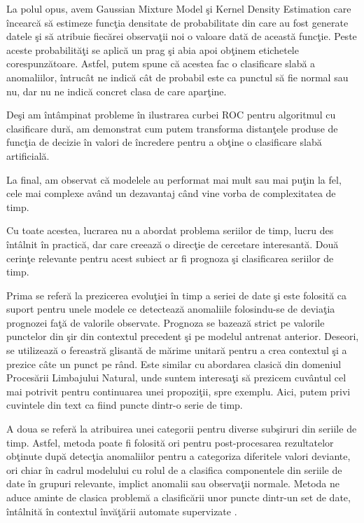 La polul opus, avem Gaussian Mixture Model şi Kernel Density 
Estimation care încearcă să estimeze funcţia densitate de probabilitate din care au fost 
generate datele şi să atribuie fiecărei observaţii noi o valoare dată de această funcţie.
Peste aceste probabilităţi se aplică un prag şi abia apoi obţinem etichetele corespunzătoare.
Astfel, putem spune că acestea fac o clasificare slabă a anomaliilor, întrucât ne indică 
cât de probabil este ca punctul să fie normal sau nu, dar nu ne indică concret clasa 
de care aparţine.

Deşi am întâmpinat probleme în ilustrarea curbei ROC pentru algoritmul cu clasificare
dură, am demonstrat cum putem transforma distanţele produse de funcţia de decizie în valori 
de încredere pentru a obţine o clasificare slabă artificială.

La final, am observat că modelele au performat mai mult sau mai puţin la fel, cele mai complexe 
având un dezavantaj când vine vorba de complexitatea de timp.

Cu toate acestea, lucrarea nu a abordat problema seriilor de timp, lucru des întâlnit în practică,
dar care creează o direcţie de cercetare interesantă. Două cerinţe relevante pentru acest 
subiect ar fi prognoza şi clasificarea seriilor de timp. 

Prima se referă la prezicerea evoluţiei
în timp a seriei de date şi este folosită ca suport pentru unele modele ce detectează anomaliile
folosindu-se de deviaţia prognozei faţă de valorile observate. Prognoza se bazează strict pe 
valorile punctelor din şir din contextul precedent şi pe modelul antrenat anterior. Deseori,
se utilizează o fereastră glisantă de mărime unitară pentru a crea contextul şi a prezice 
câte un punct pe rând. Este similar cu abordarea clasică 
din domeniul Procesării Limbajului Natural, unde suntem interesaţi să prezicem cuvântul cel 
mai potrivit pentru continuarea unei propoziţii, spre exemplu. Aici, putem privi cuvintele
din text ca fiind puncte dintr-o serie de timp.

A doua se referă la atribuirea unei categorii pentru diverse subşiruri din seriile de timp.
Astfel, metoda poate fi folosită ori pentru post-procesarea rezultatelor obţinute după 
detecţia anomaliilor pentru a categoriza diferitele valori deviante, ori chiar în cadrul 
modelului cu rolul de a clasifica componentele din seriile de date în grupuri relevante,
implict anomalii sau observaţii normale. Metoda ne aduce aminte de clasica problemă
a clasificării unor puncte dintr-un set de date, întâlnită în contextul învăţării automate
supervizate \cite{time-series}.
